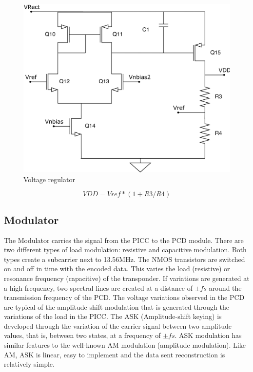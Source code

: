 \documentclass[a4paper, 10pt, conference]{ieeeconf}      %
\begin{document}
\begin{figure}[H]
\centering
\includegraphics[width=0.8\linewidth]{Images/ImagenesTesina/circuitos/LDO.png}
\caption{Voltage regulator}
\label{fig:ldo}
\end{figure}

\begin{equation} \label{eq:vref}
VDD = Vref*(1+R3/R4)
\end{equation}

\subsection{Modulator}
The Modulator carries the signal from the PICC to the PCD module. There are two different types of load modulation: resistive and capacitive modulation. Both types create a subcarrier next to 13.56MHz. The NMOS transistors are switched on and off in time with the encoded data. This varies the load (resistive) or resonance frequency (capacitive) of the transponder. 
If variations are generated at a high frequency, two spectral lines are created at a distance of $\pm \textit{fs}$ around the transmission frequency of the PCD. The voltage variations observed in the PCD are typical of the amplitude shift modulation that is generated through the variations of the load in the PICC. The ASK (Amplitude-shift keying) is developed through the variation of the carrier signal between two amplitude values, that is, between two states, at a frequency of $\pm \textit{fs}$. ASK modulation has similar features to the well-known AM modulation (amplitude modulation). Like AM, ASK is linear, easy to implement and the data sent reconstruction is relatively simple.
\end{document}
